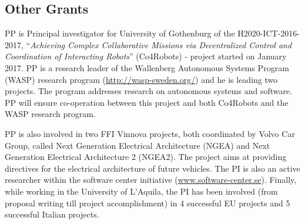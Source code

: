 \documentclass[12pt]{article}
\newcommand{\nb}[2]{
    \fcolorbox{gray}{yellow}{\bfseries\sffamily\scriptsize#1}
    {\sf\small$\blacktriangleright$\textit{#2}$\blacktriangleleft$}
   }
\newcommand{\nb}[2]{}
\newcommand\patrizio[1]{\nb{Patrizio}{#1}}
\begin{document}
\vspace{-.4cm}

\subsection{Other Grants}
\vspace{-.3cm}
PP is Principal investigator for University of Gothenburg of the H2020-ICT-2016-2017, ``{\em Achieving Complex Collaborative Missions via Decentralized Control and Coordination of Interacting Robots}'' (Co4Robots) - project started on January 2017. 
PP is a research leader of the Wallenberg Autonomous Systems Program (WASP) research program ({\small \url{http://wasp-sweden.org/}}) and he is leading two projects. The program addresses research on autonomous systems and software. %
PP will ensure co-operation between this project and both Co4Robots and the WASP research program.

PP is also involved in two FFI Vinnova projects, both coordinated by Volvo Car Group, called Next Generation Electrical Architecture (NGEA) and Next Generation Electrical Architecture 2 (NGEA2). The project aims at providing directives for the electrical architecture of future vehicles. 
The PI is also an active researcher within the software center initiative ({\small \url{www.software-center.se}}).
Finally, while working in the University of L'Aquila, the PI has been involved (from proposal writing till project accomplishment) in 4 successful EU projects and 5 successful Italian projects. %

\end{document}
